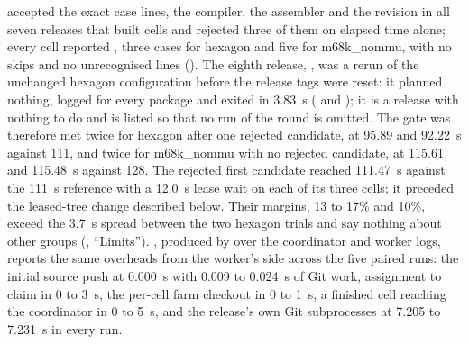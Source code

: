  accepted the exact case lines, the compiler, the assembler
and the revision in all seven releases that built cells and rejected three of
them on elapsed time alone; every cell reported , three cases for
hexagon and five for m68k\_nommu, with no skips and no unrecognised lines
(). The eighth release, , was a
rerun of the unchanged hexagon configuration before the release tags were
reset: it planned nothing, logged  for every package and
exited in 3.83~s ( and
); it is a release with nothing to do and is
listed so that no run of the round is omitted. The gate was therefore met
twice for hexagon after one rejected candidate, at 95.89 and 92.22~s against
111, and twice for m68k\_nommu with no rejected candidate, at 115.61 and
115.48~s against 128. The rejected first candidate reached 111.47~s against
the 111~s reference with a 12.0~s lease wait on each of its three cells; it
preceded the leased-tree change described below. Their margins, 13 to 17\% and 10\%, exceed
the 3.7~s spread between the two hexagon trials and say nothing about other
groups (, ``Limits'').
, produced by 
over the coordinator and worker logs, reports the same overheads from the
worker's side across the five paired runs: the initial source push at
0.000~s with 0.009 to 0.024~s of Git work, assignment to claim in 0 to 3~s,
the per-cell farm checkout in 0 to 1~s, a finished cell reaching the
coordinator in 0 to 5~s, and the release's own Git subprocesses at 7.205 to
7.231~s in every run.

